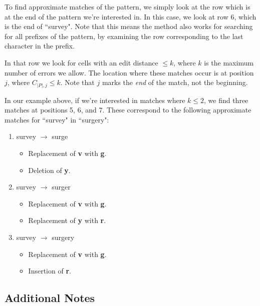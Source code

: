 \documentclass[10pt]{article}
\begin{document}
To find approximate matches of the pattern, we simply look at the row which is
at the end of the pattern we're interested in. In this case, we look at row 6,
which is the end of ``survey". Note that this means the method also works for
searching for all prefixes of the pattern, by examining the row corresponding
to the last character in the prefix.

In that row we look for cells with an edit distance $\leq k$, where $k$ is the
maximum number of errors we allow. The location where these matches occur is at
position $j$, where $C_{|P|, j} \leq k$. Note that $j$ marks the \textit{end}
of the match, not the beginning.

In our example above, if we're interested in matches where $k \leq 2$, we find
three matches at positions 5, 6, and 7. These correspond to the following
approximate matches for ``survey" in ``surgery":

\begin{enumerate}
\item survey $\longrightarrow$ surge
    \begin{itemize}
    \item Replacement of \textbf{v} with \textbf{g}.
    \item Deletion of \textbf{y}.
    \end{itemize}
\item survey $\longrightarrow$ surger
    \begin{itemize}
    \item Replacement of \textbf{v} with \textbf{g}.
    \item Replacement of \textbf{y} with \textbf{r}.
    \end{itemize}
\item survey $\longrightarrow$ surgery
    \begin{itemize}
    \item Replacement of \textbf{v} with \textbf{g}.
    \item Insertion of \textbf{r}.
    \end{itemize}
\end{enumerate}

\subsection*{Additional Notes}
\end{document}

